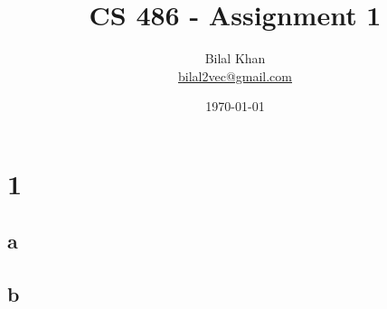 \documentclass[11pt]{article}
\title{CS 486 - Assignment 1}
\author{Bilal Khan\\
\href{mailto:bilal2vec@gmail.com}{bilal2vec@gmail.com}}
\date{\today}
\begin{document}
\maketitle
\tableofcontents

\section{1}

\subsection{a}

\subsection{b}
\end{document}
